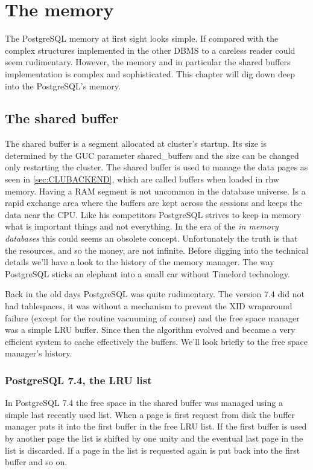 \chapter{The memory}
\label{ch:PGMEMORY}
The PostgreSQL memory at first sight looks simple. If compared with the complex structures implemented in 
the other DBMS to a careless reader could seem rudimentary. However, the memory and in particular the 
shared buffers implementation is complex and sophisticated. This chapter will dig down deep into the 
PostgreSQL's memory.

\section{The shared buffer}
The shared buffer is a segment allocated at cluster's startup. Its size is determined by the GUC parameter 
shared\_buffers and the size can be changed only restarting the cluster. The shared buffer is used 
to manage the data pages as seen in \ref{sec:CLUBACKEND}, which are called buffers when loaded in 
rhw memory. Having a RAM segment is not uncommon in the database universe. Is a rapid exchange 
area where the buffers are kept across the sessions and keeps the data near the CPU. Like his competitors 
PostgreSQL strives to keep in memory what is important things and not everything. In the era of the 
\textit{in memory databases} this could seems an obsolete concept. Unfortunately the truth is that the 
resources, and so the money, are not infinite. Before digging into the technical details we'll have a look 
to the history of the memory manager. The way PostgreSQL sticks an elephant into a small car without 
Timelord technology.

Back in the old days PostgreSQL was quite rudimentary. The version 7.4 did not had tablespaces, it was 
without a mechanism to prevent the XID wraparound failure (except for the routine vacuuming of course) 
and the free space manager was a simple LRU buffer. Since then the algorithm evolved and became a 
very efficient system to cache effectively the buffers. We'll look briefly to the free space manager's 
history. 

\subsection{PostgreSQL 7.4, the LRU list}
In PostgreSQL 7.4 the free space in the shared buffer was managed using a simple last recently used list. 
When a page is first request from disk the buffer manager puts it into the first buffer in the free LRU 
list. If the first buffer is used by another page the list is shifted by one unity and the eventual last 
page in the list is discarded. If a page in the list is requested again is put back into the first buffer 
and so on.

